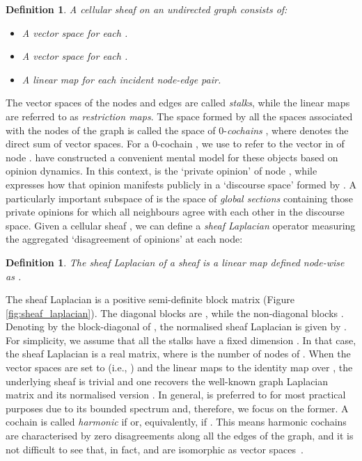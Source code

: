 \documentclass{article}
\newtheorem{definition}[theorem]{Definition}
\begin{document}
\begin{definition}
A cellular sheaf  on an undirected graph  consists of:
\begin{itemize}[leftmargin=10mm, topsep=0pt,itemsep=-0.4ex]
    \item A vector space  for each .
    \item A vector space  for each .
    \item A linear map  for each incident  node-edge pair.
\end{itemize}
\end{definition}
\vspace{-5pt}
The vector spaces of the nodes and edges are called \emph{stalks}, while the linear maps are referred to as \emph{restriction maps}. The space formed by all the spaces associated with the nodes of the graph is called the space of 0-{\em cochains} , where  denotes the direct sum of vector spaces.
For a 0-cochain , we use  to refer to the vector in  of node . \citet{hansen2021opinion} have constructed a convenient mental model for these objects based on opinion dynamics. In this context,  is the `private opinion' of node , while  expresses how that opinion manifests publicly in a `discourse space' formed by . A particularly important subspace of  is the space of \emph{global sections}  containing those private opinions  for which all neighbours  agree with each other in the discourse space. 
Given a cellular sheaf , we can define a {\em sheaf Laplacian} operator \citep{hansen2019toward} measuring the aggregated `disagreement of opinions' at each node:
\begin{definition}\label{def:laplacian}
The sheaf Laplacian of a sheaf  is a linear map  defined node-wise as . 
\end{definition}
\vspace{-5pt}
The sheaf Laplacian is a positive semi-definite block matrix (Figure \ref{fig:sheaf_laplacian}). The diagonal blocks are , while the non-diagonal blocks . Denoting by  the block-diagonal of , the normalised sheaf Laplacian is given by . For simplicity, we assume that all the stalks have a fixed dimension . In that case, the sheaf Laplacian is a  real matrix, where  is the number of nodes of . When the vector spaces are set to  (i.e.,  ) and the linear maps to the identity map over , the underlying sheaf is trivial and one recovers the well-known  graph Laplacian matrix and its normalised version . In general,  is preferred to  for most practical purposes due to its bounded spectrum and, therefore, we focus on the former. A cochain  is called {\em harmonic} if  or, equivalently, if . This means harmonic cochains are characterised by zero disagreements along all the edges of the graph, and it is not difficult to see that, in fact,  and  are isomorphic as vector spaces~\citep{hansen2021opinion}.
\end{document}
